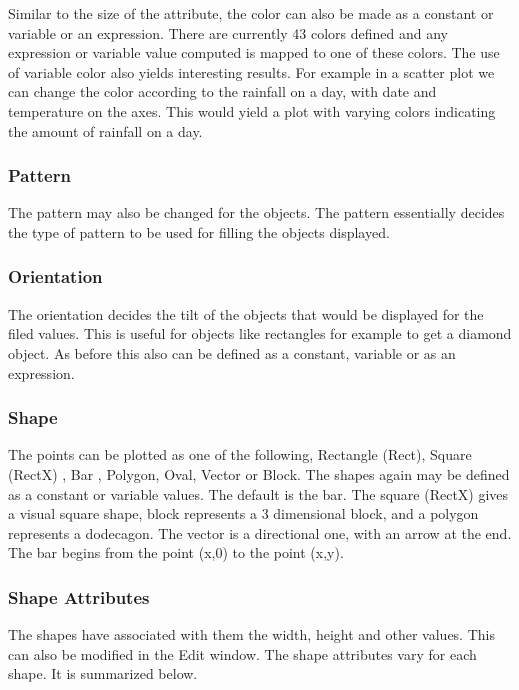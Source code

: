Similar to the size of the attribute, the color can also be made as a constant or variable or an expression. There are currently 43 colors defined and any expression or variable value computed is mapped to one of these colors. The use of variable color also yields interesting results. For example in a scatter plot we can change the color according to the rainfall on a day, with date and temperature on the axes. This would yield a plot with varying colors indicating the amount of rainfall on a day.

\subsubsection{Pattern}

The pattern may also be changed for the objects. The pattern essentially decides the type of pattern to be used for filling the objects displayed. 

\subsubsection{Orientation}

The orientation decides the tilt of the objects that would be displayed for the filed values. This is useful for objects like rectangles for example to get a diamond object. As before this also can be defined as a constant, variable or as an expression.

\subsubsection{Shape}

The points can be plotted as one of the following, Rectangle (Rect), Square (RectX) , Bar , Polygon, Oval, Vector or Block. The shapes again may be defined as a constant or variable values. The default is the bar. The square (RectX) gives a visual square shape, block represents a 3 dimensional block, and a polygon represents a dodecagon. The vector is a directional one, with an arrow at the end. The bar begins from the point (x,0) to the point (x,y). 

\subsubsection{Shape Attributes}

The shapes have associated with them the width, height and other values. This can also be modified in the Edit window. The shape attributes vary for each shape. It is summarized below.

